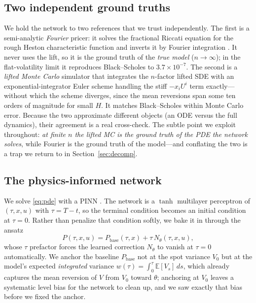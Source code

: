 \documentclass[11pt]{article}
\begin{document}
\subsection{Two independent ground truths}
We hold the network to two references that we trust independently.
The first is a semi-analytic \emph{Fourier} pricer: it solves the fractional
Riccati equation for the rough Heston characteristic function
\citep{eleuch2019characteristic} and inverts it by Fourier integration
\citep{carr1999option}. It never uses the lift, so it is the ground truth of the
\emph{true model} ($n\to\infty$); in the flat-volatility limit it reproduces
Black--Scholes to $3.7\times10^{-7}$. The second is a \emph{lifted Monte Carlo}
simulator that integrates the $n$-factor lifted SDE with an exponential-integrator
Euler scheme handling the stiff $-x_i U^i$ term exactly---without which the scheme
diverges, since the mean reversions span some ten orders of magnitude for small
$H$. It matches Black--Scholes within Monte Carlo error. Because the two
approximate different objects (an ODE versus the full dynamics), their agreement
is a real cross-check. The subtle point we exploit throughout: \emph{at finite $n$
the lifted MC is the ground truth of the PDE the network solves}, while Fourier is
the ground truth of the model---and conflating the two is a trap we return to in
Section~\ref{sec:decomp}.

\subsection{The physics-informed network}
We solve \eqref{eq:pde} with a PINN \citep{raissi2019physics}. The network is a
$\tanh$ multilayer perceptron of $(\tau,x,u)$ with $\tau=T-t$, so the terminal
condition becomes an initial condition at $\tau=0$. Rather than penalize that
condition softly, we bake it in through the ansatz
\begin{equation}
P(\tau,x,u)=P_{\mathrm{base}}(\tau,x)+\tau\,N_\theta(\tau,x,u),
\label{eq:ansatz}
\end{equation}
whose $\tau$ prefactor forces the learned correction $N_\theta$ to vanish at
$\tau=0$ automatically. We anchor the baseline $P_{\mathrm{base}}$ not at the spot
variance $V_0$ but at the model's expected \emph{integrated} variance
$w(\tau)=\int_0^\tau \mathbb{E}[V_s]\,ds$, which already captures the mean
reversion of $V$ from $V_0$ toward $\theta$; anchoring at $V_0$ leaves a
systematic level bias for the network to clean up, and we saw exactly that bias
before we fixed the anchor.
\end{document}
